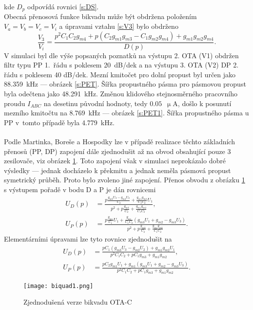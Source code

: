 kde $D_p$ odpovídá rovnici \ref{s:DS}.\\
Obecná přenosová funkce bikvadu může být obdržena položením $V_a = V_b = V_c = V_i$ a úpravami vztahu \ref{s:V3} bylo obdrženo
\begin{equation}
\frac{V_3}{V_i} = \frac{p^2C_1C_2g_{m4} + p(C_2g_{m1}g_{m3} - C_1g_{m2}g_{m4}) + g_{m1}g_{m2}g_{m4}}{D(p)}.
\end{equation}
\noindent 
V simulaci byl dle výše popsaných poznatků na výstupu 2. OTA (V1) obdržen filtr typu PP 1.~řádu s poklesem 20~dB/dek a na výstupu 3. OTA (V2) DP 2. řádu s poklesem 40 dB/dek. Mezní kmitočet pro dolní propust byl určen jako 88.359~kHz --- obrázek \ref{s:PET}. Šířka propustného pásma pro pásmovou propust byla odečtena jako 48.291~kHz. Změnou klidového stejnosměrného pracovního proudu $I_{ABC}$ na desetinu původní hodnoty, tedy $0.05$~$\upmu$A, došlo k posunutí mezního kmitočtu na 8.769~kHz --- obrázek \ref{s:PET1}. Šířka propustného pásma u PP v~tomto případě byla 4.779~kHz.\\
\\
\noindent Podle Martinka, Boreše a Hospodky \cite{12} lze v případě realizace těchto základních přenosů (PP, DP) zapojení dále zjednodušit až na obvod obsahující pouze 3 zesilovače, viz obrázek \ref{s:BIK2}. Toto zapojení však v simulaci neprokázalo dobré výsledky --- jednak docházelo k překmitu a jednak neměla pásmová propust symetrický průběh. Proto bylo zvoleno jiné zapojení. Přenos obvodu z obrázku \ref{s:BIK2} s výstupem pořadě v bodu D a P je dán rovnicemi
\begin{align}
U_D(p) &= \frac{p\frac{g_{m3}U_3-g_{m2}U_2}{C_2}+\frac{g_{m1}g_{m2}}{C_1C_2}U_1}{p^2 + p\frac{g_{m3}}{C_2} + \frac{g_{m1}g_{m2}}{C_1C_2}},\\
U_P(p) &= \frac{p\frac{g_{m1}}{C_1}U_1 + \frac{g_{m1}}{C_1C_2}(g_{m3}U_1+g_{m2}-g_{m3}U_3)}{p^2 + p\frac{g_{m3}}{C_2} + \frac{g_{m1}g_{m2}}{C_1C_2}}.
\end{align}
\noindent Elementárními úpravami lze tyto rovnice zjednodušit na
\begin{align}
U_D(p) &= \frac{pC_1(g_{m3}U_3 - g_{m2}U_2) + g_{m1}g_{m2}U_1}{p^2C_1C_2 + pC_1g_{m3} + g_{m1}g_{m2}},\\
U_P(p) &= \frac{pC_2g_{m1}U_1 + g_{m1}(g_{m3}U_1 + g_{m2} - g_{m3}U_3)}{p^2C_1C_2 + pC_1g_{m3} + g_{m1}g_{m2}}.
\end{align}
\begin{figure}[h]
\centering
\texttt{[image: biquad1.png]}
\caption[Zjednodušená verze bikvadu OTA-C]{Zjednodušená verze bikvadu OTA-C \label{s:BIK2}}
\end{figure}
